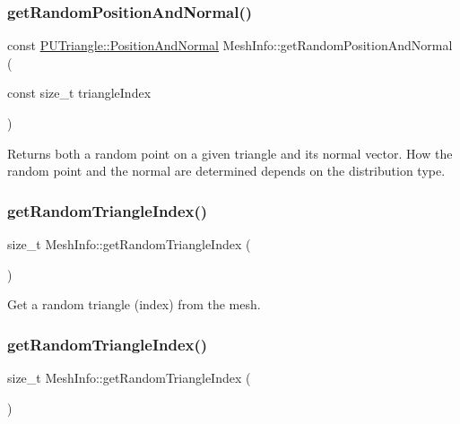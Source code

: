 \subsubsection{\texorpdfstring{get\+Random\+Position\+And\+Normal()}{getRandomPositionAndNormal()}\hspace{0.1cm}{\footnotesize\ttfamily [2/2]}}
{\footnotesize\ttfamily const \hyperlink{structPUTriangle_1_1PositionAndNormal}{P\+U\+Triangle\+::\+Position\+And\+Normal} Mesh\+Info\+::get\+Random\+Position\+And\+Normal (\begin{DoxyParamCaption}\item[{const size\+\_\+t}]{triangle\+Index }\end{DoxyParamCaption})}

Returns both a random point on a given triangle and its normal vector. How the random point and the normal are determined depends on the distribution type. \mbox{\label{classMeshInfo_a7e3355c03d8c7e8147d563cac098094f}} 
\subsubsection{\texorpdfstring{get\+Random\+Triangle\+Index()}{getRandomTriangleIndex()}\hspace{0.1cm}{\footnotesize\ttfamily [1/2]}}
{\footnotesize\ttfamily size\+\_\+t Mesh\+Info\+::get\+Random\+Triangle\+Index (\begin{DoxyParamCaption}{ }\end{DoxyParamCaption})}

Get a random triangle (index) from the mesh. \mbox{\label{classMeshInfo_a7e3355c03d8c7e8147d563cac098094f}} 
\subsubsection{\texorpdfstring{get\+Random\+Triangle\+Index()}{getRandomTriangleIndex()}\hspace{0.1cm}{\footnotesize\ttfamily [2/2]}}
{\footnotesize\ttfamily size\+\_\+t Mesh\+Info\+::get\+Random\+Triangle\+Index (\begin{DoxyParamCaption}{ }\end{DoxyParamCaption})}

